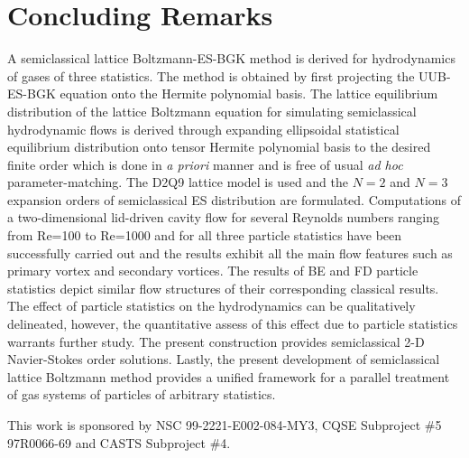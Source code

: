 \documentclass[doublecol]{epl2}
\begin{document}
\section{Concluding Remarks}
A semiclassical lattice Boltzmann-ES-BGK method is derived for hydrodynamics of gases of three statistics. The method is obtained by first projecting the UUB-ES-BGK equation onto the Hermite polynomial basis.  The lattice equilibrium distribution of the lattice Boltzmann equation for simulating semiclassical hydrodynamic flows is derived through expanding ellipsoidal statistical equilibrium distribution onto tensor Hermite polynomial basis to the desired finite order which is done in {\sl a priori} manner and is free of usual {\sl ad hoc} parameter-matching. The D2Q9 lattice model is used and the $N=2$ and $N=3$ expansion orders of semiclassical ES distribution are formulated. Computations of a two-dimensional lid-driven cavity flow for several Reynolds numbers ranging from Re=100 to Re=1000 and for all three particle statistics have been successfully carried out and the results exhibit all the main flow features such as primary vortex and secondary vortices. The results of BE and FD particle statistics depict similar flow structures of their corresponding classical results. The effect of particle statistics on the hydrodynamics can be qualitatively delineated, however, the quantitative assess of this effect due to particle statistics warrants further study.  The present construction provides semiclassical 2-D Navier-Stokes order solutions. Lastly, the present development of semiclassical lattice Boltzmann method provides a unified framework for a parallel treatment of gas systems of particles of arbitrary statistics.

\acknowledgments
This work is sponsored by NSC 99-2221-E002-084-MY3, CQSE Subproject \#5 97R0066-69 and CASTS Subproject \#4.
\end{document}
